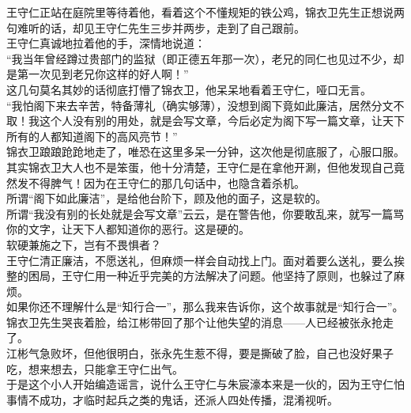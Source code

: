 \begin{multicols}{\theparacolNo}
王守仁正站在庭院里等待着他，看着这个不懂规矩的铁公鸡，锦衣卫先生正想说两句难听的话，却见王守仁先生三步并两步，走到了自己跟前。\\

王守仁真诚地拉着他的手，深情地说道：\\

“我当年曾经蹲过贵部门的监狱（即正德五年那一次），老兄的同仁也见过不少，却是第一次见到老兄你这样的好人啊！”\\

这几句莫名其妙的话彻底打懵了锦衣卫，他呆呆地看着王守仁，哑口无言。\\

“我怕阁下来去辛苦，特备薄礼（确实够薄），没想到阁下竟如此廉洁，居然分文不取！我这个人没有别的用处，就是会写文章，今后必定为阁下写一篇文章，让天下所有的人都知道阁下的高风亮节！”\\

锦衣卫踉踉跄跄地走了，唯恐在这里多呆一分钟，这次他是彻底服了，心服口服。\\

其实锦衣卫大人也不是笨蛋，他十分清楚，王守仁是在拿他开涮，但他发现自己竟然发不得脾气！因为在王守仁的那几句话中，也隐含着杀机。\\

所谓“阁下如此廉洁”，是给他台阶下，顾及他的面子，这是软的。\\

所谓“我没有别的长处就是会写文章”云云，是在警告他，你要敢乱来，就写一篇骂你的文字，让天下人都知道你的恶行。这是硬的。\\

软硬兼施之下，岂有不畏惧者？\\

王守仁清正廉洁，不愿送礼，但麻烦一样会自动找上门。面对着要么送礼，要么挨整的困局，王守仁用一种近乎完美的方法解决了问题。他坚持了原则，也躲过了麻烦。\\

如果你还不理解什么是“知行合一”，那么我来告诉你，这个故事就是“知行合一”。\\

锦衣卫先生哭丧着脸，给江彬带回了那个让他失望的消息——人已经被张永抢走了。\\

江彬气急败坏，但他很明白，张永先生惹不得，要是撕破了脸，自己也没好果子吃，想来想去，只能拿王守仁出气。\\

于是这个小人开始编造谣言，说什么王守仁与朱宸濠本来是一伙的，因为王守仁怕事情不成功，才临时起兵之类的鬼话，还派人四处传播，混淆视听。\\


\end{multicols}
